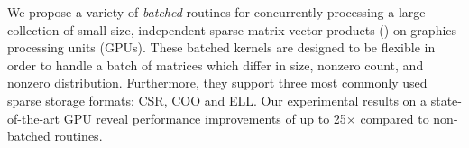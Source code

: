 We propose a variety of {\em batched} routines for 
concurrently processing a large collection of small-size, independent sparse matrix-vector products (\spmv)
on graphics processing units (GPUs).
These batched \spmv kernels are designed to be flexible in order to handle
a batch of matrices which differ in size, nonzero count, and nonzero distribution. Furthermore,
they support three most commonly used sparse storage formats: CSR, COO and ELL.
Our experimental results on a state-of-the-art GPU reveal performance improvements
of up to 25$\times$ compared to non-batched \spmv routines.
